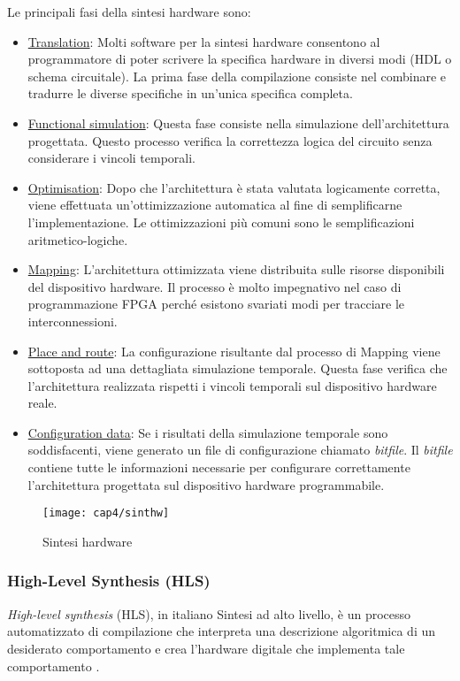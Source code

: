 Le principali fasi della sintesi hardware sono:
\begin{itemize}
	\item \underline{Translation}: Molti software per la sintesi hardware consentono al programmatore di poter scrivere la specifica hardware in diversi modi (HDL o schema circuitale). La prima fase della compilazione consiste nel combinare e tradurre le diverse specifiche in un'unica specifica completa.
	\item \underline{Functional simulation}: Questa fase consiste nella simulazione dell'architettura progettata. Questo processo verifica la correttezza logica del circuito senza considerare i vincoli temporali.
	\item \underline{Optimisation}: Dopo che l'architettura è stata valutata logicamente corretta, viene effettuata un'ottimizzazione automatica al fine di semplificarne l'implementazione. Le ottimizzazioni più comuni sono le semplificazioni aritmetico-logiche.
	\item \underline{Mapping}: L'architettura ottimizzata viene distribuita sulle risorse disponibili del dispositivo hardware. Il processo è molto impegnativo nel caso di programmazione FPGA perché esistono svariati modi per tracciare le interconnessioni.
	\item \underline{Place and route}: La configurazione risultante dal processo di Mapping viene sottoposta ad una dettagliata simulazione temporale. Questa fase verifica che l'architettura realizzata rispetti i vincoli temporali sul dispositivo hardware reale.
	\item \underline{Configuration data}: Se i risultati della simulazione temporale sono soddisfacenti, viene generato un file di configurazione chiamato \textit{bitfile}. Il \textit{bitfile} contiene tutte le informazioni necessarie per configurare correttamente l'architettura progettata sul dispositivo hardware programmabile.
\end{itemize}

\begin{figure}  
  \begin{center}
    \texttt{[image: cap4/sinthw]}
    \caption{Sintesi hardware}
  \end{center}
\end{figure}
		
\subsubsection{High-Level Synthesis (HLS)}
\textit{High-level synthesis} (HLS), in italiano Sintesi ad alto livello, è un processo automatizzato di compilazione che interpreta una descrizione algoritmica di un desiderato comportamento e crea l'hardware digitale che implementa tale comportamento \cite{Coussy:2008:HSA:1457713}.

